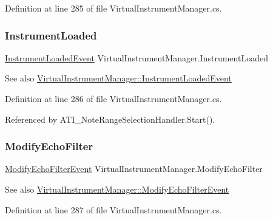 Definition at line 285 of file Virtual\+Instrument\+Manager.\+cs.

\mbox{\label{group___v_i_m_events_gad79b789b020d7e4a8c149ec653c0b97f}} 
\subsubsection{\texorpdfstring{Instrument\+Loaded}{InstrumentLoaded}}
{\footnotesize\ttfamily \hyperlink{group___v_i_m_event_types_class_virtual_instrument_manager_1_1_instrument_loaded_event}{Instrument\+Loaded\+Event} Virtual\+Instrument\+Manager.\+Instrument\+Loaded}

\begin{DoxySeeAlso}{See also}
\hyperlink{group___v_i_m_event_types_class_virtual_instrument_manager_1_1_instrument_loaded_event}{Virtual\+Instrument\+Manager\+::\+Instrument\+Loaded\+Event} 
\end{DoxySeeAlso}


Definition at line 286 of file Virtual\+Instrument\+Manager.\+cs.



Referenced by A\+T\+I\+\_\+\+Note\+Range\+Selection\+Handler.\+Start().

\mbox{\label{group___v_i_m_events_ga112ed15f48fd261f1ad71c3c953c0a58}} 
\subsubsection{\texorpdfstring{Modify\+Echo\+Filter}{ModifyEchoFilter}}
{\footnotesize\ttfamily \hyperlink{group___v_i_m_event_types_class_virtual_instrument_manager_1_1_modify_echo_filter_event}{Modify\+Echo\+Filter\+Event} Virtual\+Instrument\+Manager.\+Modify\+Echo\+Filter}

\begin{DoxySeeAlso}{See also}
\hyperlink{group___v_i_m_event_types_class_virtual_instrument_manager_1_1_modify_echo_filter_event}{Virtual\+Instrument\+Manager\+::\+Modify\+Echo\+Filter\+Event} 
\end{DoxySeeAlso}


Definition at line 287 of file Virtual\+Instrument\+Manager.\+cs.



